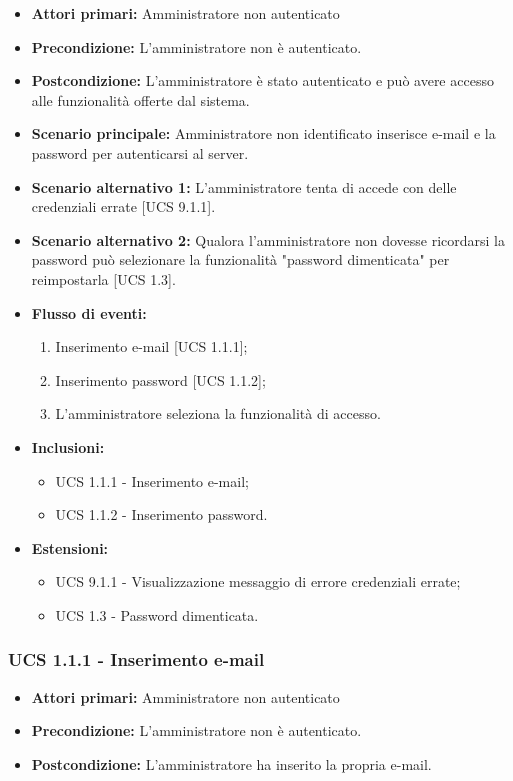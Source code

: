 \begin{itemize}
\item \textbf{Attori primari:} Amministratore non autenticato
\item \textbf{Precondizione:} L'amministratore non è autenticato.
\item \textbf{Postcondizione:} L'amministratore è stato autenticato e può avere accesso alle funzionalità offerte dal sistema.
\item \textbf{Scenario principale:} Amministratore non identificato inserisce e-mail e la password per autenticarsi al server.
\item \textbf{Scenario alternativo 1:} L'amministratore tenta di accede con delle credenziali errate [UCS 9.1.1].
\item \textbf{Scenario alternativo 2:} Qualora l'amministratore non dovesse ricordarsi la password può selezionare la funzionalità "password dimenticata" per reimpostarla [UCS 1.3].
\item \textbf{Flusso di eventi:}
    \begin{enumerate}
        \item Inserimento e-mail [UCS 1.1.1];
        \item Inserimento password [UCS 1.1.2];
        \item L'amministratore seleziona la funzionalità di accesso.
    \end{enumerate}
    \item \textbf{Inclusioni:}
	\begin{itemize}		
		\item UCS 1.1.1 - Inserimento e-mail;
		\item UCS 1.1.2 - Inserimento password.
	\end{itemize}
    \item \textbf{Estensioni:}
    \begin{itemize}
		\item UCS 9.1.1 - Visualizzazione messaggio di errore credenziali errate;
		\item UCS 1.3 - Password dimenticata.
	\end{itemize}
\end{itemize}

\subsubsection{UCS 1.1.1 - Inserimento e-mail}%
\begin{itemize}
\item \textbf{Attori primari:} Amministratore non autenticato
\item \textbf{Precondizione:} L'amministratore non è autenticato.
\item \textbf{Postcondizione:} L'amministratore ha inserito la propria e-mail.
\end{itemize}

